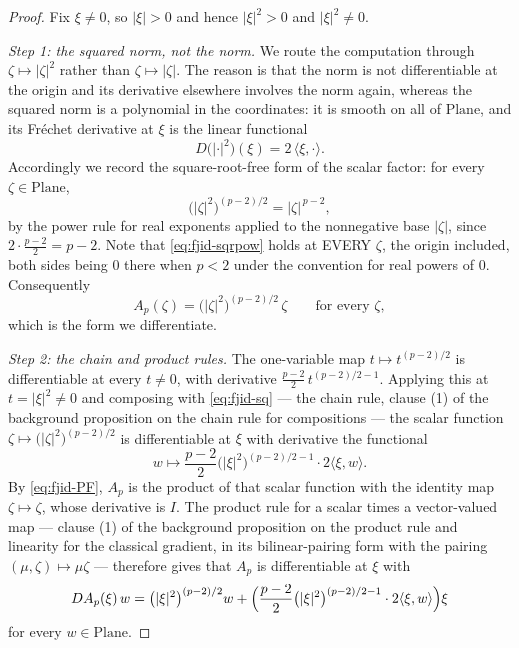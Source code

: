 \begin{proof}
Fix $\xi\ne0$, so $\lvert\xi\rvert>0$ and hence $\lvert\xi\rvert^{2}>0$ and
$\lvert\xi\rvert^{2}\ne0$.

\medskip\noindent\emph{Step 1: the squared norm, not the norm.}
We route the computation through $\zeta\mapsto\lvert\zeta\rvert^{2}$ rather than
$\zeta\mapsto\lvert\zeta\rvert$.  The reason is that the norm is not differentiable at the origin
and its derivative elsewhere involves the norm again, whereas the squared norm is a polynomial in
the coordinates: it is smooth on all of $\mathrm{Plane}$, and its Fr\'echet derivative at $\xi$ is
the linear functional
\begin{equation}\label{eq:fjid-sq}
  D\bigl(\lvert\cdot\rvert^{2}\bigr)(\xi)=2\,\langle\xi,\cdot\rangle .
\end{equation}
Accordingly we record the square-root-free form of the scalar factor: for every
$\zeta\in\mathrm{Plane}$,
\begin{equation}\label{eq:fjid-sqrpow}
  \bigl(\lvert\zeta\rvert^{2}\bigr)^{(p-2)/2}=\lvert\zeta\rvert^{\,p-2},
\end{equation}
by the power rule for real exponents applied to the nonnegative base $\lvert\zeta\rvert$, since
$2\cdot\frac{p-2}{2}=p-2$.  Note that \eqref{eq:fjid-sqrpow} holds at EVERY $\zeta$, the origin
included, both sides being $0$ there when $p<2$ under the convention for real powers of $0$.
Consequently
\begin{equation}\label{eq:fjid-PF}
  A_p(\zeta)=\bigl(\lvert\zeta\rvert^{2}\bigr)^{(p-2)/2}\,\zeta
  \qquad\text{for every }\zeta ,
\end{equation}
which is the form we differentiate.

\medskip\noindent\emph{Step 2: the chain and product rules.}
The one-variable map $t\mapsto t^{(p-2)/2}$ is differentiable at every $t\ne0$, with derivative
$\frac{p-2}{2}\,t^{(p-2)/2-1}$.  Applying this at $t=\lvert\xi\rvert^{2}\ne0$ and composing with
\eqref{eq:fjid-sq} --- the chain rule, clause (1) of the background proposition on the chain rule
for compositions --- the scalar function
$\zeta\mapsto\bigl(\lvert\zeta\rvert^{2}\bigr)^{(p-2)/2}$ is differentiable at $\xi$ with
derivative the functional
\[
  w\longmapsto\frac{p-2}{2}\bigl(\lvert\xi\rvert^{2}\bigr)^{(p-2)/2-1}\cdot2\langle\xi,w\rangle .
\]
By \eqref{eq:fjid-PF}, $A_p$ is the product of that scalar function with the identity map
$\zeta\mapsto\zeta$, whose derivative is $I$.  The product rule for a scalar times a
vector-valued map --- clause (1) of the background proposition on the product rule and linearity
for the classical gradient, in its bilinear-pairing form with the pairing
$(\mu,\zeta)\mapsto\mu\zeta$ --- therefore gives that $A_p$ is differentiable at $\xi$ with
\begin{equation}\label{eq:fjid-der}
  DA_p(\xi)\,w
  =\bigl(\lvert\xi\rvert^{2}\bigr)^{(p-2)/2}w
    +\Bigl(\frac{p-2}{2}\bigl(\lvert\xi\rvert^{2}\bigr)^{(p-2)/2-1}\cdot
      2\langle\xi,w\rangle\Bigr)\xi
\end{equation}
for every $w\in\mathrm{Plane}$.


\end{proof}
